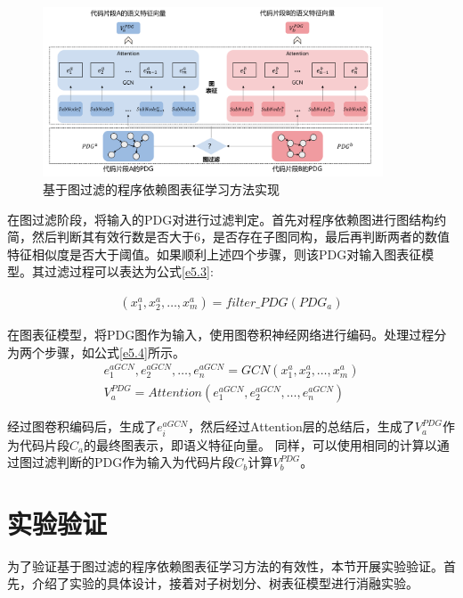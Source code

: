 \begin{figure}[H]
  \centering
  \includegraphics[width=0.9\textwidth]{figures/pdg.png}
  \caption{基于图过滤的程序依赖图表征学习方法实现}\label{fig:pdg}
\end{figure}

在图过滤阶段，将输入的PDG对进行过滤判定。首先对程序依赖图进行图结构约简，然后判断其有效行数是否大于6，是否存在子图同构，最后再判断两者的数值特征相似度是否大于阈值。如果顺利上述四个步骤，则该PDG对输入图表征模型。其过滤过程可以表达为公式\ref{e5.3}:

\begin{equation}\label{e5.3}
  \begin{split}
    \left(x_{1}^{a},x_{2}^{a},\ldots,x_{m}^{a}\right) = filter\_PDG \left(PDG_{a}\right)
  \end{split}
\end{equation}


在图表征模型，将PDG图作为输入，使用图卷积神经网络进行编码。处理过程分为两个步骤，如公式\ref{e5.4}所示。
\begin{equation}\label{e5.4}
  \begin{split}
    e_{1}^{aGCN},e_{2}^{aGCN},\ldots,e_{n}^{aGCN} = GCN\left(x_{1}^{a},x_{2}^{a},\ldots,x_{m}^{a}\right) \\
    V_{a}^{PDG} = Attention \left( e_{1}^{aGCN},e_{2}^{aGCN},\ldots,e_{n}^{aGCN} \right)
  \end{split}
\end{equation}

经过图卷积编码后，生成了$e_{i}^{aGCN}$，然后经过Attention层的总结后，生成了$V_{a}^{PDG}$作为代码片段$C_{a}$的最终图表示，即语义特征向量。
同样，可以使用相同的计算以通过图过滤判断的PDG作为输入为代码片段$C_{b}$计算$V_{b}^{PDG}$。

\section{实验验证}
\label{sec:PDGExperiment}
为了验证基于图过滤的程序依赖图表征学习方法的有效性，本节开展实验验证。首先，介绍了实验的具体设计，接着对子树划分、树表征模型进行消融实验。

